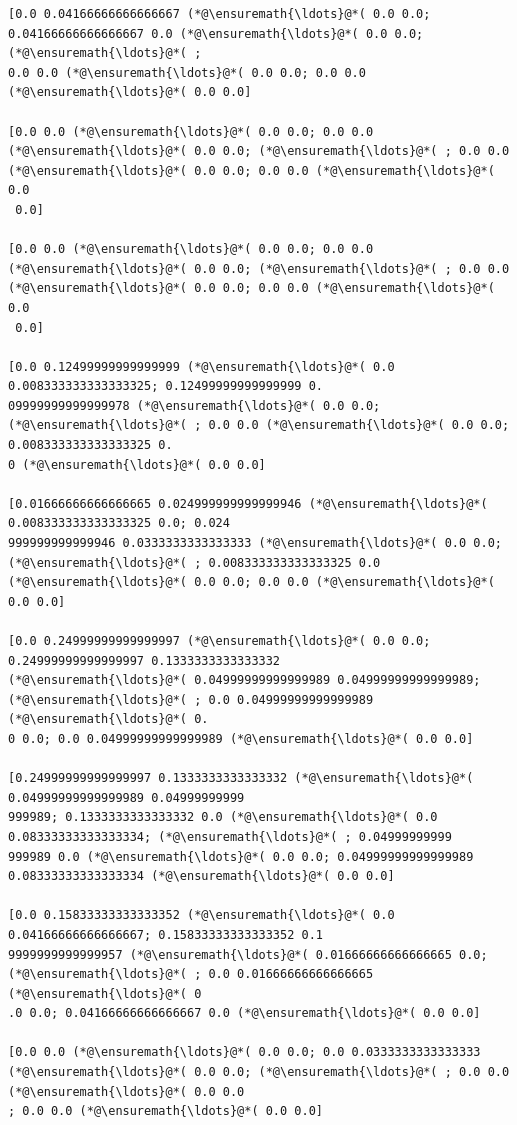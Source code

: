 \documentclass[12pt,a4paper]{article}
\begin{document}
\begin{lstlisting}
[0.0 0.04166666666666667 (*@\ensuremath{\ldots}@*( 0.0 0.0; 0.04166666666666667 0.0 (*@\ensuremath{\ldots}@*( 0.0 0.0; (*@\ensuremath{\ldots}@*( ; 
0.0 0.0 (*@\ensuremath{\ldots}@*( 0.0 0.0; 0.0 0.0 (*@\ensuremath{\ldots}@*( 0.0 0.0]

[0.0 0.0 (*@\ensuremath{\ldots}@*( 0.0 0.0; 0.0 0.0 (*@\ensuremath{\ldots}@*( 0.0 0.0; (*@\ensuremath{\ldots}@*( ; 0.0 0.0 (*@\ensuremath{\ldots}@*( 0.0 0.0; 0.0 0.0 (*@\ensuremath{\ldots}@*( 0.0
 0.0]

[0.0 0.0 (*@\ensuremath{\ldots}@*( 0.0 0.0; 0.0 0.0 (*@\ensuremath{\ldots}@*( 0.0 0.0; (*@\ensuremath{\ldots}@*( ; 0.0 0.0 (*@\ensuremath{\ldots}@*( 0.0 0.0; 0.0 0.0 (*@\ensuremath{\ldots}@*( 0.0
 0.0]

[0.0 0.12499999999999999 (*@\ensuremath{\ldots}@*( 0.0 0.008333333333333325; 0.12499999999999999 0.
09999999999999978 (*@\ensuremath{\ldots}@*( 0.0 0.0; (*@\ensuremath{\ldots}@*( ; 0.0 0.0 (*@\ensuremath{\ldots}@*( 0.0 0.0; 0.008333333333333325 0.
0 (*@\ensuremath{\ldots}@*( 0.0 0.0]

[0.01666666666666665 0.024999999999999946 (*@\ensuremath{\ldots}@*( 0.008333333333333325 0.0; 0.024
999999999999946 0.0333333333333333 (*@\ensuremath{\ldots}@*( 0.0 0.0; (*@\ensuremath{\ldots}@*( ; 0.008333333333333325 0.0 
(*@\ensuremath{\ldots}@*( 0.0 0.0; 0.0 0.0 (*@\ensuremath{\ldots}@*( 0.0 0.0]

[0.0 0.24999999999999997 (*@\ensuremath{\ldots}@*( 0.0 0.0; 0.24999999999999997 0.1333333333333332 
(*@\ensuremath{\ldots}@*( 0.04999999999999989 0.04999999999999989; (*@\ensuremath{\ldots}@*( ; 0.0 0.04999999999999989 (*@\ensuremath{\ldots}@*( 0.
0 0.0; 0.0 0.04999999999999989 (*@\ensuremath{\ldots}@*( 0.0 0.0]

[0.24999999999999997 0.1333333333333332 (*@\ensuremath{\ldots}@*( 0.04999999999999989 0.04999999999
999989; 0.1333333333333332 0.0 (*@\ensuremath{\ldots}@*( 0.0 0.08333333333333334; (*@\ensuremath{\ldots}@*( ; 0.04999999999
999989 0.0 (*@\ensuremath{\ldots}@*( 0.0 0.0; 0.04999999999999989 0.08333333333333334 (*@\ensuremath{\ldots}@*( 0.0 0.0]

[0.0 0.15833333333333352 (*@\ensuremath{\ldots}@*( 0.0 0.04166666666666667; 0.15833333333333352 0.1
9999999999999957 (*@\ensuremath{\ldots}@*( 0.01666666666666665 0.0; (*@\ensuremath{\ldots}@*( ; 0.0 0.01666666666666665 (*@\ensuremath{\ldots}@*( 0
.0 0.0; 0.04166666666666667 0.0 (*@\ensuremath{\ldots}@*( 0.0 0.0]

[0.0 0.0 (*@\ensuremath{\ldots}@*( 0.0 0.0; 0.0 0.0333333333333333 (*@\ensuremath{\ldots}@*( 0.0 0.0; (*@\ensuremath{\ldots}@*( ; 0.0 0.0 (*@\ensuremath{\ldots}@*( 0.0 0.0
; 0.0 0.0 (*@\ensuremath{\ldots}@*( 0.0 0.0]


\end{lstlisting}
\end{document}
